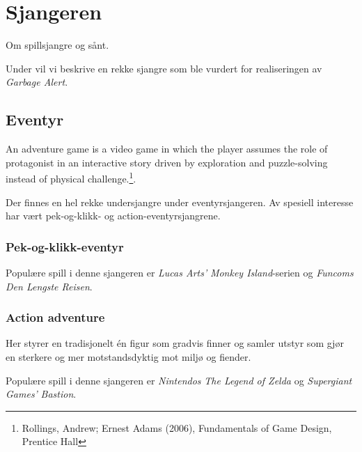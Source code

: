 \section{Sjangeren}\label{sec:sjangre}
Om spillsjangre og sånt.




Under vil vi beskrive en rekke sjangre som ble vurdert for realiseringen av \emph{Garbage Alert}.

\subsection{Eventyr}\label{sec:eventyr}
An adventure game is a video game in which the player assumes the role of protagonist in an interactive story driven by exploration and puzzle-solving instead of physical challenge.\footnote{Rollings, Andrew; Ernest Adams (2006), Fundamentals of Game Design, Prentice Hall}.

Der finnes en hel rekke undersjangre under eventyrsjangeren. Av spesiell interesse har vært pek-og-klikk- og action-eventyrsjangrene.
	
	\subsubsection{Pek-og-klikk-eventyr}


	Populære spill i denne sjangeren er \emph{Lucas Arts'} \emph{Monkey Island}-serien og \emph{Funcoms} \emph{Den Lengste Reisen}.


	\subsubsection{Action adventure}

	Her styrer en tradisjonelt én figur som gradvis finner og samler utstyr som gjør en sterkere og mer motstandsdyktig mot miljø og fiender.


	Populære spill i denne sjangeren er \emph{Nintendos} \emph{The Legend of Zelda} og \emph{Supergiant Games'} \emph{Bastion}.





